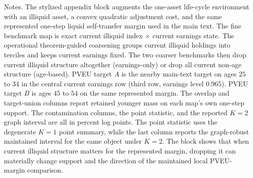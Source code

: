 \begin{table}[t]
\centering
\caption{Stylized liquid/illiquid extension: current-map discipline beyond the one-asset benchmark}
\label{tab:liquid-illiquid-map-comparison}
\footnotesize
\renewcommand{\arraystretch}{1.08}
\begin{minipage}{0.98\textwidth}
\footnotesize Notes. The stylized appendix block augments the one-asset life-cycle environment with an illiquid asset, a convex quadratic adjustment cost, and the same represented one-step liquid self-transfer margin used in the main text. The fine benchmark map is exact current illiquid index $\times$ current earnings state. The operational theorem-guided coarsening groups current illiquid holdings into terciles and keeps current earnings fixed. The two coarser benchmarks then drop current illiquid structure altogether (earnings-only) or drop all current non-age structure (age-based). PVEU target $A$ is the nearby main-text target on ages $25$ to $34$ in the central current earnings row (third row, earnings level $0.965$). PVEU target $B$ is ages $45$ to $54$ on the same represented margin. The overlap and target-union columns report retained younger mass on each map's own one-step support. The contamination columns, the point statistic, and the reported $K=2$ graph interval are all in percent log points. The point statistic uses the degenerate $K=1$ point summary, while the last column reports the graph-robust maintained interval for the same object under $K=2$. The block shows that when current illiquid structure matters for the represented margin, dropping it can materially change support and the direction of the maintained local PVEU-margin comparison.
\end{minipage}
\end{table}

